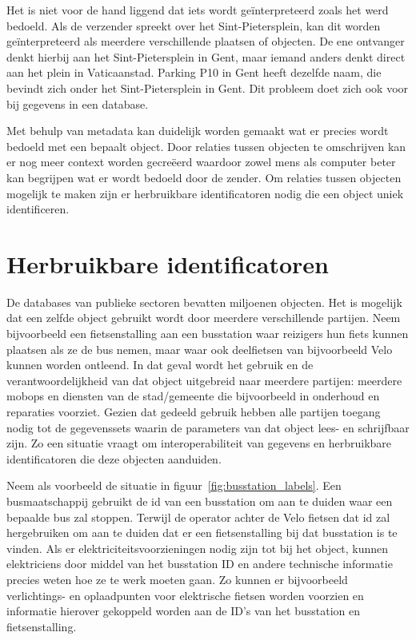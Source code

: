 Het is niet voor de hand liggend dat iets wordt geïnterpreteerd zoals het werd bedoeld. Als de verzender spreekt over het Sint-Pietersplein, kan dit worden geïnterpreteerd als meerdere verschillende plaatsen of objecten. De ene ontvanger denkt hierbij aan het Sint-Pietersplein in Gent, maar iemand anders denkt direct aan het plein in Vaticaanstad. Parking P10 in Gent heeft dezelfde naam, die bevindt zich onder het Sint-Pietersplein in Gent. Dit probleem doet zich ook voor bij gegevens in een database.

Met behulp van metadata kan duidelijk worden gemaakt wat er precies wordt bedoeld met een bepaalt object. Door relaties tussen objecten te omschrijven kan er nog meer context worden gecreëerd waardoor zowel mens als computer beter kan begrijpen wat er wordt bedoeld door de zender. Om relaties tussen objecten mogelijk te maken zijn er herbruikbare identificatoren nodig die een object uniek identificeren.

\section{Herbruikbare identificatoren}
\label{sec:herbruikbare_ids}
De databases van publieke sectoren bevatten miljoenen objecten. Het is mogelijk dat een zelfde object gebruikt wordt door meerdere verschillende partijen. Neem bijvoorbeeld een fietsenstalling aan een busstation waar reizigers hun fiets kunnen plaatsen als ze de bus nemen, maar waar ook deelfietsen van bijvoorbeeld Velo kunnen worden ontleend. In dat geval wordt het gebruik en de verantwoordelijkheid van dat object uitgebreid naar meerdere partijen: meerdere \glspl{mobop} en diensten van de stad/gemeente die bijvoorbeeld in onderhoud en reparaties voorziet. Gezien dat gedeeld gebruik hebben alle partijen toegang nodig tot de gegevenssets waarin de parameters van dat object lees- en schrijfbaar zijn. Zo een situatie vraagt om interoperabiliteit van gegevens en herbruikbare identificatoren die deze objecten aanduiden. 

Neem als voorbeeld de situatie in figuur~\ref{fig:busstation_labels}. Een busmaatschappij gebruikt de \acrfull{id} van een busstation om aan te duiden waar een bepaalde bus zal stoppen. Terwijl de operator achter de Velo fietsen dat \acrshort{id} zal hergebruiken om aan te duiden dat er een fietsenstalling bij dat busstation is te vinden. Als er elektriciteitsvoorzieningen nodig zijn tot bij het object, kunnen elektriciens door middel van het busstation ID en andere technische informatie precies weten hoe ze te werk moeten gaan. Zo kunnen er bijvoorbeeld verlichtings- en oplaadpunten voor elektrische fietsen worden voorzien en informatie hierover gekoppeld worden aan de ID's van het busstation en fietsenstalling.

